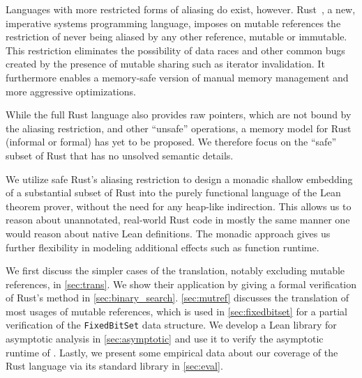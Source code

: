 Languages with more restricted forms of aliasing do exist, however.
Rust~\cite{matsakis2014rust}, a new, imperative systems programming language,
imposes on mutable references the restriction of never being aliased by any
other reference, mutable or immutable. This restriction eliminates the
possibility of data races and other common bugs created by the presence of
mutable sharing such as iterator invalidation. It furthermore enables a memory-safe
version of manual memory management and more aggressive optimizations.

While the full Rust language also provides raw pointers, which are not bound by
the aliasing restriction, and other ``unsafe'' operations, a
memory model for Rust (informal or formal) has yet to be proposed. We therefore focus on the ``safe''
subset of Rust that has no unsolved semantic details.

We utilize safe Rust's aliasing restriction to design a monadic shallow embedding of a
substantial subset of Rust
into the purely functional language of the Lean~\cite{de2015lean} theorem prover, without the need
for any heap-like indirection. This allows us to
reason about unannotated, real-world Rust code in mostly the same manner one would
reason about native Lean definitions. The monadic approach gives us further
flexibility in modeling additional effects such as function runtime.

We first discuss the simpler cases of the
translation, notably excluding mutable references, in \autoref{sec:trans}. We
show their application by giving a formal verification of Rust's
 method in \autoref{sec:binary_search}.
\autoref{sec:mutref} discusses the translation of most usages of mutable
references, which is used in \autoref{sec:fixedbitset} for a partial verification of the
\texttt{FixedBitSet} data structure. We develop a Lean library for asymptotic analysis in
\autoref{sec:asymptotic} and use it to verify the asymptotic runtime of
. Lastly, we present some
empirical data about our coverage of the Rust language via its standard library in \autoref{sec:eval}.